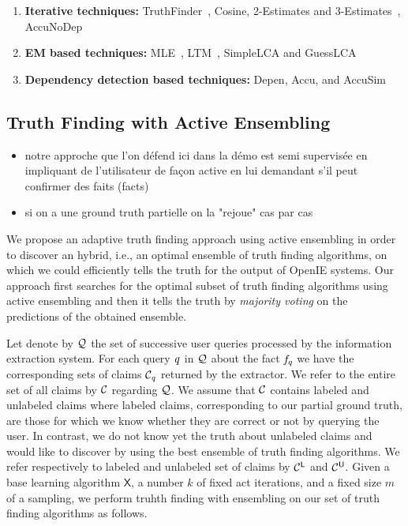 \begin{enumerate}
 \item \textbf{Iterative techniques:} TruthFinder~\cite{YinHY08}, Cosine, 2-Estimates and 3-Estimates~\cite{GallandAMS10}, 
 AccuNoDep~\cite{DongBS09}
 \item \textbf{EM based techniques:} MLE~\cite{WangKLA12}, LTM~\cite{ZhaoRGH12}, SimpleLCA and GuessLCA~\cite{PasternackR13}
 \item \textbf{Dependency detection based techniques:} Depen, Accu, and AccuSim~\cite{DongBS09}
\end{enumerate}



\subsection{Truth Finding with Active Ensembling}
\begin{itemize}
 \item notre approche que l'on défend ici dans la démo est  semi supervisée en impliquant de l'utilisateur de façon active
en lui demandant s'il peut confirmer des faits (facts)
\item si on a une ground truth partielle on la "rejoue" cas par cas
\end{itemize}

\medskip

We propose an adaptive truth finding approach using active ensembling in order to discover an hybrid, i.e., an optimal
ensemble of truth finding algorithms, on which we could efficiently tells the truth for the output of OpenIE systems.
Our approach first searches for the optimal subset of truth finding algorithms using active ensembling and then it 
tells the truth by \emph{majority voting} on the predictions of the obtained ensemble.

Let denote by $\mathcal{Q}$ the set of successive user queries processed 
by the information extraction system. For each query $\mathit{q}$ in $\mathcal{Q}$ about the fact $\mathit{f}_{\mathit{q}}$ we have the corresponding
sets of claims $\mathcal{C}_{\mathit{q}}$ returned by the extractor. We refer to the entire set of all claims by $\mathcal{C}$ regarding $\mathcal{Q}$.
We assume that $\mathcal{C}$ contains labeled and unlabeled claims where labeled claims, corresponding to our partial ground truth, are those 
for which we  know whether they are correct or not by querying the user. In contrast, we do not know yet the truth about unlabeled claims and
would like to discover by using the best ensemble of truth finding algorithms. We refer respectively to labeled and unlabeled set of claims by 
$\mathcal{C}^{\mathsf{L}}$ and $\mathcal{C}^{\mathsf{U}}$. Given a base learning algorithm $\mathsf{X}$, a number $k$ of fixed act iterations, and 
a fixed size $m$ of a sampling, we perform truhth finding with ensembling on our set of truth finding algorithms as follows.

